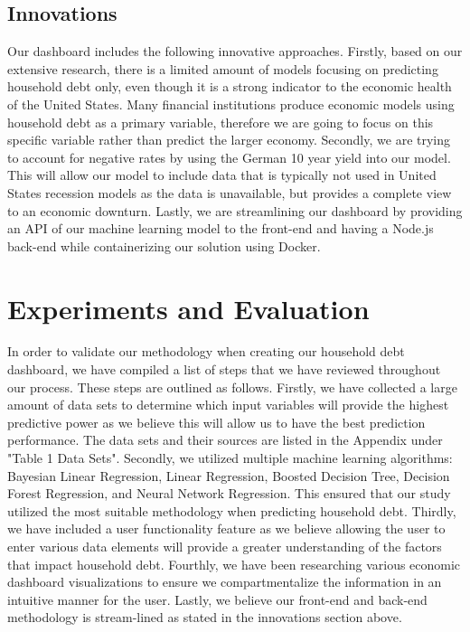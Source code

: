 \documentclass[sigconf,nonacm,11pt]{acmart}
\begin{document}
\vspace{-0.5em}


\subsection{Innovations}

Our dashboard includes the following innovative approaches. Firstly, based on our extensive research, there is a limited amount of models focusing on predicting household debt only, even though it is a strong indicator to the economic health of the United States. Many financial institutions produce economic models using household debt as a primary variable, therefore we are going to focus on this specific variable rather than predict the larger economy. Secondly, we are trying to account for negative rates by using the German 10 year yield into our model. This will allow our model to include data that is typically not used in United States recession models as the data is unavailable, but provides a complete view to an economic downturn. Lastly, we are streamlining our dashboard by providing an API of our machine learning model to the front-end and having a Node.js back-end while containerizing our solution using Docker.\vspace{-0.5em}

\section{Experiments and Evaluation}
In order to validate our methodology when creating our household debt dashboard, we have compiled a list of steps that we have reviewed throughout our process. These steps are outlined as follows. Firstly, we have collected a large amount of data sets to determine which input variables will provide the highest predictive power as we believe this will allow us to have the best prediction performance. The data sets and their sources are listed in the Appendix under "Table 1 Data Sets". Secondly, we utilized multiple machine learning algorithms: Bayesian Linear Regression, Linear Regression, Boosted Decision Tree, Decision Forest Regression, and Neural Network Regression. This ensured that our study utilized the most suitable methodology when predicting household debt. Thirdly, we have included a user functionality feature as we believe allowing the user to enter various data elements will provide a greater understanding of the factors that impact household debt. Fourthly, we have been researching various economic dashboard visualizations to ensure we compartmentalize the information in an intuitive manner for the user. Lastly, we believe our front-end and back-end methodology is stream-lined as stated in the innovations section above. 
\end{document}
